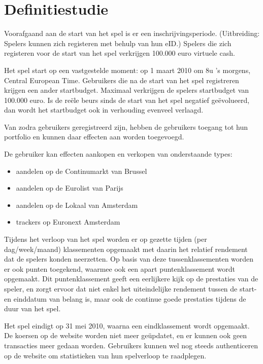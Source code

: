 \chapter{Definitiestudie}

Voorafgaand aan de start van het spel is er een inschrijvingsperiode. (Uitbreiding: Spelers kunnen zich registeren met behulp van hun eID.) Spelers die zich registeren voor de start van het spel verkrijgen 100.000 euro virtuele cash.

Het spel start op een vastgestelde moment: op 1 maart 2010 om 8u 's morgens, Central European Time. Gebruikers die na de start van het spel registreren krijgen een ander startbudget. Maximaal verkrijgen de spelers startbudget van 100.000 euro. Is de reële beurs sinds de start van het spel negatief geëvolueerd, dan wordt het startbudget ook in verhouding evenveel verlaagd.

Van zodra gebruikers geregistreerd zijn, hebben de gebruikers toegang tot hun portfolio en kunnen daar effecten aan worden toegevoegd.

De gebruiker kan effecten aankopen en verkopen van onderstaande types:
\begin{itemize}
  \setlength{\itemsep}{1pt}
  \setlength{\parskip}{0pt}
  \setlength{\parsep}{0pt}
	\item{aandelen op de Continumarkt van Brussel}
	\item{aandelen op de Eurolist van Parijs}
	\item{aandelen op de Lokaal van Amsterdam}
	\item{trackers op Euronext Amsterdam}
\end{itemize}

Tijdens het verloop van het spel worden er op gezette tijden (per dag/week/maand) klassementen opgemaakt met daarin het relatief rendement dat de spelers konden neerzetten. Op basis van deze tussenklassementen worden er ook punten toegekend, waarmee ook een apart puntenklassement wordt opgemaakt. Dit puntenklassement geeft een eerlijkere kijk op de prestaties van de speler, en zorgt ervoor dat niet enkel het uiteindelijke rendement tussen de start- en einddatum van belang is, maar ook de continue goede prestaties tijdens de duur van het spel.

Het spel eindigt op 31 mei 2010, waarna een eindklassement wordt opgemaakt. De koersen op de website worden niet meer geüpdatet, en er kunnen ook geen transacties meer gedaan worden. Gebruikers kunnen wel nog steeds authenticeren op de website om statistieken van hun spelverloop te raadplegen.

